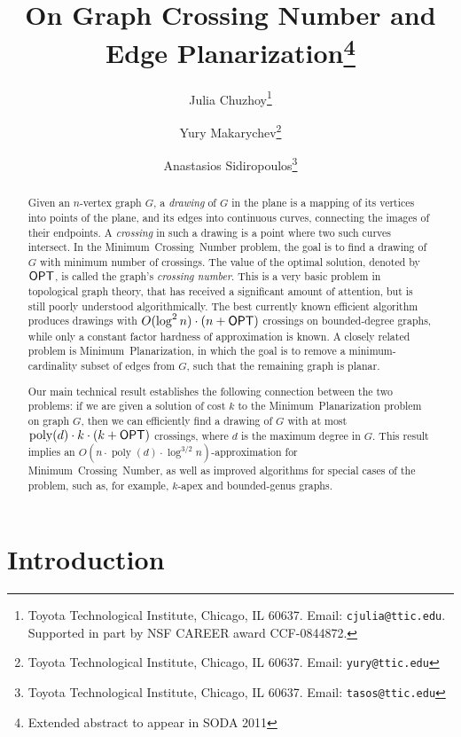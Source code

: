 \documentclass[twoside,leqno,twocolumn]{article}
\newcommand{\opt}{\mbox{\sf OPT}}
\newcommand{\poly}{\operatorname{poly}}
\newcommand{\MP}{\mbox{\sf Minimum Planarization}\xspace}
\newcommand{\MCN}{\mbox{\sf Minimum Crossing Number}\xspace}
\begin{document}
\title{\Large On Graph Crossing Number and Edge Planarization\iffull\footnote{Extended abstract to appear in SODA 2011}\fi}
\author{Julia Chuzhoy\thanks{Toyota Technological Institute, Chicago, IL
60637. Email: {\tt cjulia@ttic.edu}. Supported in part by NSF CAREER award CCF-0844872.}
 \and Yury Makarychev\thanks{Toyota Technological Institute, Chicago, IL
60637. Email: {\tt yury@ttic.edu}}\and Anastasios Sidiropoulos\thanks{Toyota Technological Institute, Chicago, IL
60637. Email: {\tt tasos@ttic.edu}}}
\date{}
\maketitle

\begin{abstract}
\ifabstract
\small\baselineskip=9pt\fi
Given an $n$-vertex graph $G$, a \emph{drawing} of $G$ in the plane is a mapping of its vertices into points of the plane, and its edges into continuous curves, connecting the images of their endpoints. 
A \emph{crossing} in such a drawing is a point where two such curves intersect. In the \MCN problem, the goal is to find a drawing of $G$ with minimum number of crossings. The value of the optimal solution, denoted by $\opt$, is called the graph's \emph{crossing number}. This is a very basic problem in topological graph theory, that has received a significant amount of attention, but is still poorly understood algorithmically. The best currently known efficient algorithm produces drawings with $O(\log^2 n) \cdot (n + \opt)$  crossings on bounded-degree graphs, while only a constant factor hardness of approximation is known. A closely related problem is \MP, in which the goal is to remove a minimum-cardinality subset of edges from $G$, such that the remaining graph is planar.

\ifabstract
\small\baselineskip=9pt\fi
Our main technical result establishes the following connection between the two problems: if we are given a solution of cost $k$ to the \MP problem on graph $G$, then we can efficiently find a drawing of $G$ with at most $\poly(d)\cdot k\cdot (k+\opt)$ crossings, where $d$ is the maximum degree in $G$. This result implies an $O(n\cdot \poly(d)\cdot \log^{3/2}n)$-approximation for \MCN, as well as improved algorithms for
special cases of the problem, such as, for example, $k$-apex and bounded-genus graphs.
\end{abstract}

\section{Introduction}
\end{document}
